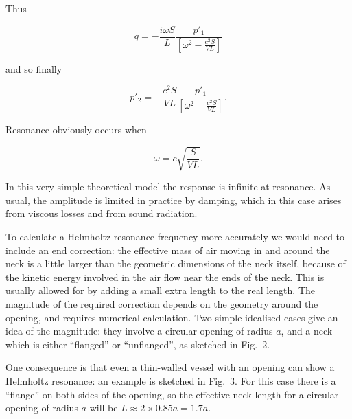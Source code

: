   Thus 

  \begin{equation*}q= -\dfrac{i \omega S}{L} \dfrac{p'_1}{\left[\omega^2 
  -\frac{c^2 S}{VL}\right]} \tag{6}\end{equation*} 

  \noindent{}and so finally 

  \begin{equation*}p'_2= -\dfrac{c^2 S}{VL} \dfrac{p'_1}{\left[\omega^2 
  -\frac{c^2 S}{VL}\right]} . \tag{7}\end{equation*} 

  Resonance obviously occurs when 

  \begin{equation*}\omega = c \sqrt{\frac{S}{VL}} .\tag{8}\end{equation*} 

  In this very simple theoretical model the response is infinite at resonance. 
  As usual, the amplitude is limited in practice by damping, which in this case 
  arises from viscous losses and from sound radiation. 

  To calculate a Helmholtz resonance frequency more accurately we would need to 
  include an end correction: the effective mass of air moving in and around the 
  neck is a little larger than the geometric dimensions of the neck itself, 
  because of the kinetic energy involved in the air flow near the ends of the 
  neck. This is usually allowed for by adding a small extra length to the real 
  length. The magnitude of the required correction depends on the geometry 
  around the opening, and requires numerical calculation. Two simple idealised 
  cases give an idea of the magnitude: they involve a circular opening of 
  radius $a$, and a neck which is either ``flanged'' or ``unflanged'', as 
  sketched in Fig.\ 2. 


  One consequence is that even a thin-walled vessel with an opening can show a 
  Helmholtz resonance: an example is sketched in Fig.\ 3. For this case there 
  is a ``flange'' on both sides of the opening, so the effective neck length 
  for a circular opening of radius $a$ will be $L \approx 2 \times 0.85 a=1.7 
  a$. 

